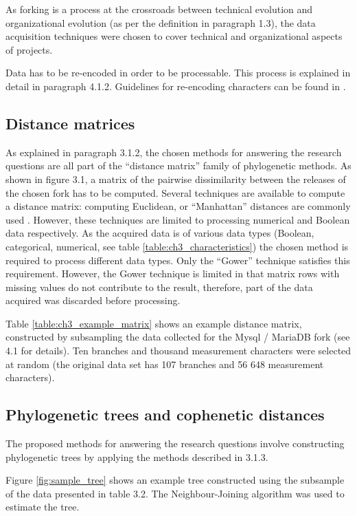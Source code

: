 As forking is a process at the crossroads between technical evolution and organizational evolution (as per the definition in paragraph 1.3), the data acquisition techniques were chosen to cover technical and organizational aspects of projects.

Data has to be re-encoded in order to be processable. This process is explained in detail in paragraph 4.1.2. Guidelines for re-encoding characters can be found in \citet{Sokal1986a}.

\subsection{Distance matrices}
As explained in paragraph 3.1.2, the chosen methods for answering the research questions are all part of the “distance matrix” family of phylogenetic methods. As shown in figure 3.1, a matrix of the pairwise dissimilarity between the releases of the chosen fork has to be computed. Several techniques are available to compute a distance matrix: computing Euclidean, or “Manhattan” distances are commonly used \citep{Felsenstein1982a}. However, these techniques are limited to processing numerical and Boolean data respectively. As the acquired data is of various data types (Boolean, categorical, numerical, see table \ref{table:ch3_characteristics}) the chosen method is required to process different data types. Only the “Gower” technique \citep{DOrazio2016} satisfies this requirement. However, the Gower technique is limited in that matrix rows with missing values do not contribute to the result, therefore, part of the data acquired was discarded before processing.

Table \ref{table:ch3_example_matrix} shows an example distance matrix, constructed by subsampling the data collected for the Mysql / MariaDB fork (see 4.1 for details). Ten branches and thousand measurement characters were selected at random (the original data set has 107 branches and 56 648 measurement characters).



\subsection{Phylogenetic trees and cophenetic distances}
The proposed methods for answering the research questions involve constructing phylogenetic trees by applying the methods described in 3.1.3.

Figure \ref{fig:sample_tree} shows an example tree constructed using the subsample of the data presented in table 3.2. The Neighbour-Joining algorithm \citep{Saitou1987a} was used to estimate the tree.


